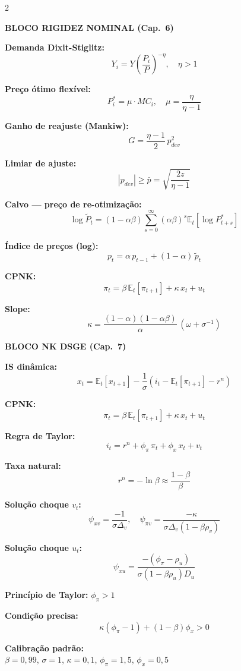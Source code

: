 \documentclass[12pt, a4paper]{article}
\newcommand{\E}{\mathbb{E}}
\begin{document}
\vspace{0.3em}
\begin{multicols}{2}

\textbf{\textcolor{cyanrbc}{BLOCO RIGIDEZ NOMINAL (Cap.\ 6)}}

\medskip
\textbf{Demanda Dixit-Stiglitz:}
\[
Y_i = Y\!\left(\frac{P_i}{P}\right)^{-\eta}, \quad \eta > 1
\]

\textbf{Preço ótimo flexível:}
\[
P_i^* = \mu\cdot MC_i,\quad \mu = \frac{\eta}{\eta-1}
\]

\textbf{Ganho de reajuste (Mankiw):}
\[
G = \frac{\eta-1}{2}\,p_{dev}^2
\]

\textbf{Limiar de ajuste:}
\[
|p_{dev}| \geq \bar{p} = \sqrt{\frac{2z}{\eta-1}}
\]

\textbf{Calvo --- preço de re-otimização:}
\[
\log\tilde{P}_t = (1-\alpha\beta)\!\sum_{s=0}^{\infty}(\alpha\beta)^s
  \E_t[\log P_{t+s}^*]
\]

\textbf{Índice de preços (log):}
\[
p_t = \alpha\,p_{t-1} + (1-\alpha)\,\tilde{p}_t
\]

\textbf{CPNK:}
\[
\pi_t = \beta\,\E_t[\pi_{t+1}] + \kappa\,x_t + u_t
\]

\textbf{Slope:}
\[
\kappa = \frac{(1-\alpha)(1-\alpha\beta)}{\alpha}\,(\omega + \sigma^{-1})
\]

\columnbreak

\textbf{\textcolor{cyanrbc}{BLOCO NK DSGE (Cap.\ 7)}}

\medskip
\textbf{IS dinâmica:}
\[
x_t = \E_t[x_{t+1}] - \frac{1}{\sigma}(i_t - \E_t[\pi_{t+1}] - r^n)
\]

\textbf{CPNK:}
\[
\pi_t = \beta\,\E_t[\pi_{t+1}] + \kappa\,x_t + u_t
\]

\textbf{Regra de Taylor:}
\[
i_t = r^n + \phi_\pi\,\pi_t + \phi_x\,x_t + v_t
\]

\textbf{Taxa natural:}
\[
r^n = -\ln\beta \approx \frac{1-\beta}{\beta}
\]

\textbf{Solução choque $v_t$:}
\[
\psi_{xv} = \frac{-1}{\sigma\Delta_v},\quad
\psi_{\pi v} = \frac{-\kappa}{\sigma\Delta_v(1-\beta\rho_v)}
\]

\textbf{Solução choque $u_t$:}
\[
\psi_{xu} = \frac{-(\phi_\pi-\rho_u)}{\sigma(1-\beta\rho_u)D_u}
\]

\textbf{Princípio de Taylor:} $\phi_\pi > 1$

\textbf{Condição precisa:}
\[
\kappa(\phi_\pi-1) + (1-\beta)\phi_x > 0
\]

\textbf{Calibração padrão:}\\[2pt]
$\beta=0{,}99$, $\sigma=1$, $\kappa=0{,}1$, $\phi_\pi=1{,}5$, $\phi_x=0{,}5$

\end{multicols}
\end{document}
